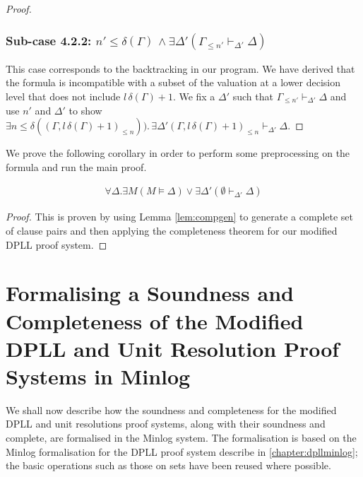 \begin{mytheorem}
\begin{proof}
\subsubsection*{Sub-case 4.2.2: $ n' \leq \delta(\Gamma) \, \wedge  \exists \Delta' ( \Gamma_{ \leq n'}  \vdash_{\Delta'} \Delta)$} 
This case corresponds to the backtracking in our program. We have derived that the formula is incompatible with a subset of the valuation at a lower decision level that does not include $l \, \delta(\Gamma) + 1$. We fix a $\Delta'$ such that $\Gamma_{\leq n'} \vdash_{\Delta'} \Delta$ and use $n'$ and $\Delta'$ to show $\exists n \leq \delta((\Gamma, l \, \delta(\Gamma) + 1)_{\leq n})). \, \exists \Delta' (\Gamma, l \, \delta(\Gamma) + 1)_{\leq n} \vdash_{\Delta'} \Delta$.
\end{proof}
\end{mytheorem}
%
We prove the following corollary in order to perform some preprocessing on the formula and run the main proof. \\
\medskip
\begin{mycorollary}
\begin{align*}
\forall \Delta. \exists M( M \models \Delta) \vee \exists \Delta'(\emptyset \vdash_{\Delta'} \Delta)
\end{align*}
\begin{proof}
This is proven by using Lemma \ref{lem:compgen} to generate a complete set of clause pairs and then applying the completeness theorem for our modified DPLL proof system.
\end{proof}
\end{mycorollary}

\section{Formalising a Soundness and Completeness of the Modified DPLL and Unit Resolution Proof Systems in Minlog}
We shall now describe how the soundness and completeness for the modified DPLL and  unit resolutions proof systems, along with their soundness and complete, are formalised in the Minlog system. The formalisation is based on the Minlog formalisation for the DPLL proof system describe in \ref{chapter:dpllminlog}; the basic operations such as those on sets have been reused where possible.


